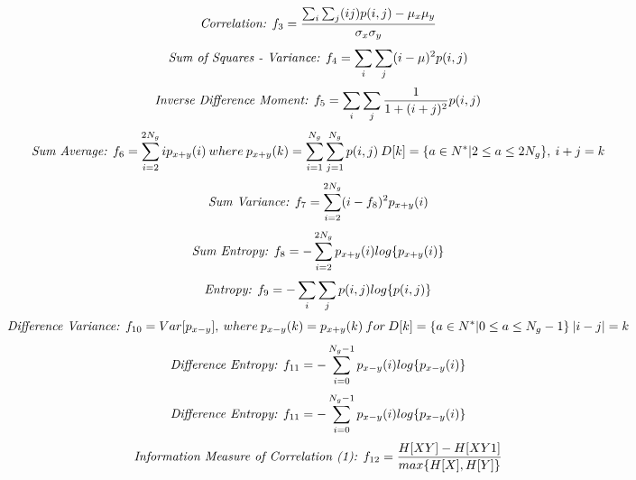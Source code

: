 \documentclass{article}
\begin{document}
	\begin{equation}
		\textit{\text{Correlation: }} f_3 = \frac{\sum_{i}\sum_{j}(ij)p(i,j) - \mu_x\mu_y}{\sigma_x\sigma_y}
		\label{eq:glcm_corr}
	\end{equation}
	\begin{equation}
		\textit{\text{Sum of Squares - Variance: }} f_4 = \sum_{i}\sum_{j}(i-\mu)^2p(i,j)
		\label{eq:glcm_sos}
	\end{equation}
	\begin{equation}
		\textit{\text{Inverse Difference Moment: }} f_5 = \sum_{i}\sum_{j}\frac{1}{1 + (i + j)^2}p(i,j)
		\label{eq:glcm_sos}
	\end{equation}
	\begin{equation}
		\textit{\text{Sum Average: }} f_6 = \sum_{i=2}^{2N_g}ip_{x+y}(i) \: where \: p_{x+y}(k) = \sum_{i=1}^{N_g}\sum_{j=1}^{N_g}p(i,j) \: D[k] = \{a \in N^* | 2 \le a \le 2N_g \}, \: i + j = k 
		\label{eq:glcm_sum_avg}
	\end{equation}
	\begin{equation}
		\textit{\text{Sum Variance: }} f_7 = \sum_{i=2}^{2N_g}(i - f_8)^2p_{x+y}(i)
		\label{eq:glcm_sum_var}
	\end{equation}
	\begin{equation}
		\textit{\text{Sum Entropy: }} f_8 = -\sum_{i=2}^{2N_g}p_{x+y}(i)log\{p_{x+y}(i)\}
		\label{eq:glcm_sum_entro}
	\end{equation}
	\begin{equation}
		\textit{\text{Entropy: }} f_9 = -\sum_{i}\sum_{j}p(i, j)log\{p(i,j)\}
		\label{eq:glcm_entro}
	\end{equation}
	\begin{equation}
		\textit{\text{Difference Variance: }} f_{10} = Var[p_{x-y}], \: where \: p_{x-y}(k) = p_{x+y}(k) \: for \: D[k] = \{a \in N^* | 0 \le a \le N_g - 1\} \: |i-j|=k
		\label{eq:glcm_diff_var}
	\end{equation}
	\begin{equation}
		\textit{\text{Difference Entropy: }} f_{11} = -\sum_{i=0}^{N_g-1}p_{x-y}(i)log\{p_{x-y}(i)\}
		\label{eq:glcm_diff_entro}
	\end{equation}
	\begin{equation}
		\textit{\text{Difference Entropy: }} f_{11} = -\sum_{i=0}^{N_g-1}p_{x-y}(i)log\{p_{x-y}(i)\}
		\label{eq:glcm_diff_entro}
	\end{equation}
	\begin{equation}
		\textit{\text{Information Measure of Correlation (1): }} f_{12} = \frac{H[XY] - H[XY1]}{max\{H[X], H[Y]\}}
		\label{eq:glcm_IMC1}
	\end{equation}
\end{document}
